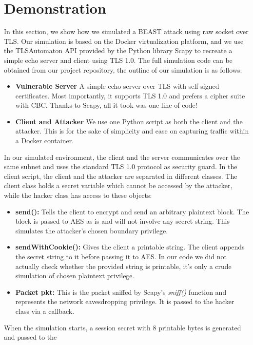 \documentclass{acm_proc_article-sp}
\begin{document}
\section{Demonstration}
In this section, we show how we simulated a BEAST attack using raw socket over TLS.
Our simulation is based on the Docker virtualization platform, and we use the TLSAutomaton API
provided by the Python library Scapy\cite{scapy} to recreate a simple echo server and client using
TLS 1.0. The full simulation code can be obtained from our project repository, the outline of our
simulation is as follows:
\begin{itemize}
    \item \textbf{Vulnerable Server} A simple echo server over TLS with self-signed certificates. Most
    importantly, it supports TLS 1.0 and prefers a cipher suite with CBC. Thanks to Scapy, all it took
    was one line of code!
    \item \textbf{Client and Attacker} We use one Python script as both the client and the attacker. This
    is for the sake of simplicity and ease on capturing traffic within a Docker container.
\end{itemize}
In our simulated environment, the client and the server communicates over the same subnet and
uses the standard TLS 1.0 protocol as security guard. In the client script, the client and the attacker
are separated in different classes. The client class holds a secret variable which cannot be accessed
by the attacker, while the hacker class has access to these objects:
\begin{itemize}
    \item \textbf{send():} Tells the client to encrypt and send an arbitrary plaintext block. The block is
    passed to AES as is and will not involve any secret string. This simulates the attacker's chosen
    boundary privilege.
    \item \textbf{sendWithCookie():} Gives the client a printable string. The client appends the secret
    string to it before passing it to AES. In our code we did not actually check whether the provided
    string is printable, it's only a crude simulation of chosen plaintext privilege.
    \item \textbf{Packet pkt:} This is the packet sniffed by Scapy's \textit{sniff()} function and
    represents the network eavesdropping privilege. It is passed to the hacker class via a callback.
\end{itemize}
When the simulation starts, a session secret with 8 printable bytes is generated and passed to the
\end{document}
